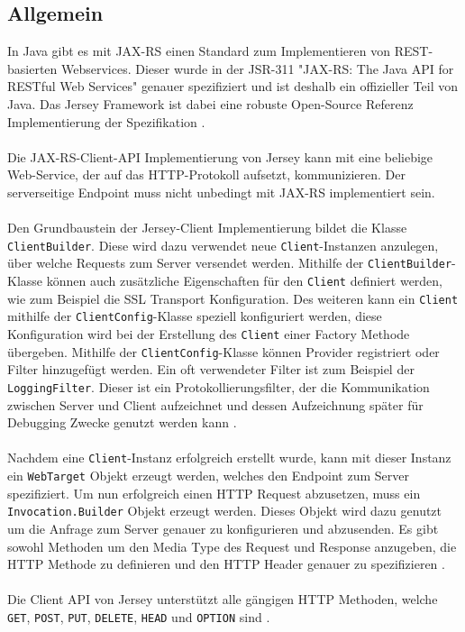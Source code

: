 \subsection{Allgemein}
In Java gibt es mit JAX-RS einen Standard zum Implementieren von REST-basierten Webservices. Dieser wurde in der JSR-311 "JAX-RS: The Java API for RESTful Web Services" \cite{jsr311} genauer spezifiziert und ist deshalb ein offizieller Teil von Java. Das Jersey Framework ist dabei eine robuste Open-Source Referenz Implementierung der Spezifikation \cite{restfulWS:Kubert}.
\\\\
Die JAX-RS-Client-API Implementierung von Jersey kann mit eine beliebige Web-Service, der auf das HTTP-Protokoll aufsetzt, kommunizieren. Der serverseitige Endpoint muss nicht unbedingt mit JAX-RS implementiert sein.
\\\\
Den Grundbaustein der Jersey-Client Implementierung bildet die Klasse \texttt{ClientBuilder}. Diese wird dazu verwendet neue \texttt{Client}-Instanzen anzulegen, über welche Requests zum Server versendet werden. Mithilfe der \texttt{ClientBuilder}-Klasse können auch zusätzliche Eigenschaften für den \texttt{Client} definiert werden, wie zum Beispiel die SSL Transport Konfiguration. Des weiteren kann ein \texttt{Client} mithilfe der \texttt{ClientConfig}-Klasse speziell konfiguriert werden, diese Konfiguration wird bei der Erstellung des \texttt{Client} einer Factory Methode übergeben. Mithilfe der \texttt{ClientConfig}-Klasse können Provider registriert oder Filter hinzugefügt werden. Ein oft verwendeter Filter ist zum Beispiel der \texttt{LoggingFilter}. Dieser ist ein Protokollierungsfilter, der die Kommunikation zwischen Server und Client aufzeichnet und dessen Aufzeichnung später für Debugging Zwecke genutzt werden kann \cite{jersey:doku}. 
\\\\
Nachdem eine \texttt{Client}-Instanz erfolgreich erstellt wurde, kann mit dieser Instanz ein \texttt{WebTarget} Objekt erzeugt werden, welches den Endpoint zum Server spezifiziert. Um nun erfolgreich einen HTTP Request abzusetzen, muss ein \texttt{Invocation.Builder} Objekt erzeugt werden. Dieses Objekt wird dazu genutzt um die Anfrage zum Server genauer zu konfigurieren und abzusenden. Es gibt sowohl Methoden um den Media Type des Request und Response anzugeben, die HTTP Methode zu definieren und den HTTP Header genauer zu spezifizieren \cite{jersey:doku}.
\\\\
Die Client API von Jersey unterstützt alle gängigen HTTP Methoden, welche \texttt{GET}, \texttt{POST}, \texttt{PUT}, \texttt{DELETE}, \texttt{HEAD} und \texttt{OPTION} sind \cite{invocation:api}.

